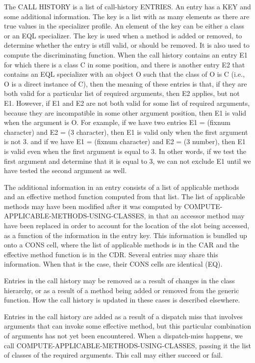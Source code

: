 The CALL HISTORY is a list of call-history ENTRIES.  An entry has a
KEY and some additional information.  The key is a list with as many
elements as there are true values in the specializer profile.  An
element of the key can be either a class or an EQL specializer.  The
key is used when a method is added or removed, to determine whether
the entry is still valid, or should be removed.  It is also used to
compute the discriminating function.  When the call history contains
an entry E1 for which there is a class C in some position, and there is
another entry E2 that contains an EQL specializer with an object O such
that the class of O is C (i.e., O is a direct instance of C), then the
meaning of these entries is that, if they are both valid for a
particular list of required arguments, then E2 applies, but not E1.
However, if E1 and E2 are not both valid for some list of required
arguments,  because they are incompatible in some other argument
position, then E1 is valid when the argument is O.  For example, if we
have two entries E1 = (fixnum character) and E2 = (3 character), then
E1 is valid only when the first argument is not 3.  and if we have 
E1 = (fixnum character) and E2 = (3 number), then E1 is valid even
when the first argument is equal to 3.  In other words, if we test the
first argument and determine that it is equal to 3, we can not exclude
E1 until we have tested the second argument as well.

The additional information in an entry consists of a list of
applicable methods and an effective method function computed from that
list.  The list of applicable methods may have been modified after it
was computed by COMPUTE-APPLICABLE-METHODS-USING-CLASSES, in that an
accessor method may have been replaced in order to account for the
location of the slot being accessed, as a function of the information
in the entry key.  This information is bundled up onto a CONS cell,
where the list of applicable methods is in the CAR and the effective
method function is in the CDR. Several entries may share this
information.  When that is the case, their CONS cells are identical
(EQ).

Entries in the call history may be removed as a result of changes in
the class hierarchy, or as a result of a method being added or removed
from the generic function.  How the call history is updated in these
cases is described elsewhere.

Entries in the call history are added as a result of a dispatch miss
that involves arguments that can invoke some effective method, but
this particular combination of arguments has not yet been encountered.
When a dispatch-miss happens, we call
COMPUTE-APPLICABLE-METHODS-USING-CLASSES, passing it the list of
classes of the required arguments.  This call may either succeed or
fail.

